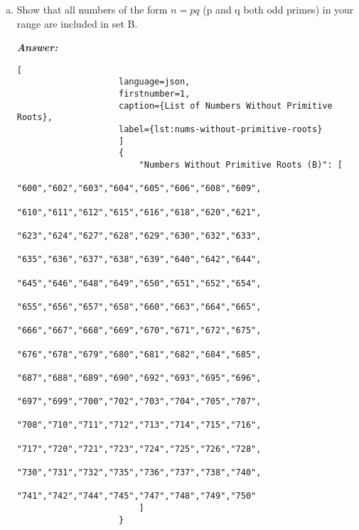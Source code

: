 \documentclass[11pt,a4paper,fleqn]{article}
\makeatletter
\newcommand{\tpmod}[1]{{\@displayfalse\pmod{#1}}}
\makeatother
\begin{document}
\begin{enumerate}[1.]
\begin{enumerate}[(a)]
\begin{flushleft}
				Also,
				\begin{align}
					& a^m \equiv 1\tpmod{pq} \\
					& \Longleftrightarrow a^m \equiv 1\tpmod p, a^m \equiv 1\tpmod q (\text{By Chinese Remainder Theorem})\\
					& \Longleftrightarrow m \equiv 0\tpmod{p-1}, m \equiv 0\tpmod{q-1}\\
					&(\text{Because by Fermat\'s Little Theorem, $a^{p-1} \equiv 1 \tpmod{p}$ and $a^{q-1} \equiv 1\tpmod{q}$})\nonumber\\
					& \Longleftrightarrow (p-1)|m, (q-1)|m \\
					& \Longleftrightarrow lcm(p-1, q-1)|m
				\end{align}
				This means that $ord_p(a) = lcm(p-1, q-1) < (p-1)(q-1)$ as we have seen in \ref{item:Q3biii} and it's a contradiction from our initial assumption that  $n = p.q$ has primitive roots.
			\end{flushleft}

			\item Show that all numbers of the form $n = pq$ (p and q both odd primes) in your range are included in set B.
			\begin{flushleft}
				\textbf{\textit{Answer:}}
				\begin{lstlisting}[
					language=json,
					firstnumber=1,
					caption={List of Numbers Without Primitive Roots},
					label={lst:nums-without-primitive-roots}
					]
					{
						"Numbers Without Primitive Roots (B)": [
						"600","602","603","604","605","606","608","609",
						"610","611","612","615","616","618","620","621",
						"623","624","627","628","629","630","632","633",
						"635","636","637","638","639","640","642","644",
						"645","646","648","649","650","651","652","654",
						"655","656","657","658","660","663","664","665",
						"666","667","668","669","670","671","672","675",
						"676","678","679","680","681","682","684","685",
						"687","688","689","690","692","693","695","696",
						"697","699","700","702","703","704","705","707",
						"708","710","711","712","713","714","715","716",
						"717","720","721","723","724","725","726","728",
						"730","731","732","735","736","737","738","740",
						"741","742","744","745","747","748","749","750"
						]
					}
				\end{lstlisting}


\end{flushleft}
\end{enumerate}
\end{enumerate}
\end{document}
